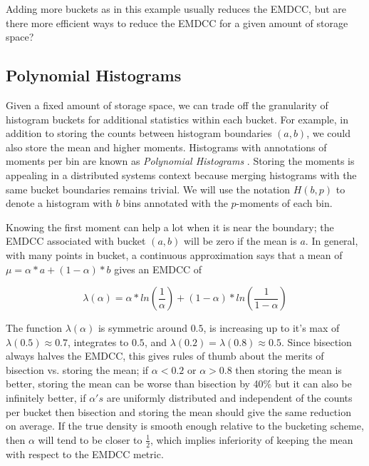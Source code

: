 \documentclass{article}
\begin{document}
Adding more buckets as in this example usually reduces the EMDCC, but
are there more efficient ways to reduce the EMDCC for a given amount
of storage space?

\subsection{Polynomial Histograms}

Given a fixed amount of storage space, we can trade off the granularity of
histogram buckets for additional statistics within each bucket.  For example,
in addition to storing the counts between histogram boundaries $(a, b)$, we
could also store the mean and higher moments.  Histograms with
annotations of moments per bin are known as \emph{Polynomial
Histograms} \cite{sagae1997bin}.  Storing the moments is appealing in
a distributed systems context because merging histograms with the same
bucket boundaries remains trivial.  We will use the notation $H(b,p)$ to
denote a histogram with $b$ bins annotated with the $p$-moments of
each bin.

Knowing the first moment can help a lot when it is near the boundary; the
EMDCC associated with bucket $(a, b)$ will be zero if the mean is $a$.
In general, with many points in bucket, a continuous approximation says that a mean of $\mu = \alpha * a + (1-\alpha) * b$ gives an EMDCC of

$$
\lambda(\alpha) = \alpha * ln(\frac{1}{\alpha}) + (1 - \alpha) * ln(\frac{1}{1-\alpha})
$$

The function $\lambda(\alpha)$ is symmetric around $0.5$, is increasing up to it's max of $\lambda(0.5) \approx 0.7$, integrates to $0.5$, and $\lambda(0.2) = \lambda(0.8) \approx 0.5$.  Since bisection always halves the EMDCC, this gives rules of thumb about the merits of bisection vs. storing the mean; if $\alpha < 0.2$ or $\alpha > 0.8$ then storing the mean is better, storing the mean can be worse than bisection by 40\% but it can also be infinitely better, if $\alpha's$ are uniformly distributed and independent of the counts per bucket then bisection and storing the mean should give the same reduction on average.  If the true density is smooth enough relative to the bucketing scheme, then $\alpha$ will tend to be closer to $\frac{1}{2}$, which implies inferiority of keeping the mean with respect to the EMDCC metric.
\end{document}
